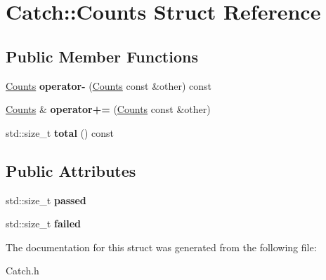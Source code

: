 \hypertarget{struct_catch_1_1_counts}{\section{Catch\-:\-:Counts Struct Reference}
\label{struct_catch_1_1_counts}
}
\subsection*{Public Member Functions}
\begin{DoxyCompactItemize}
\item 
\hypertarget{struct_catch_1_1_counts_aedf86fefe33938d132a6981171cd83e6}{\hyperlink{struct_catch_1_1_counts}{Counts} {\bfseries operator-\/} (\hyperlink{struct_catch_1_1_counts}{Counts} const \&other) const }\label{struct_catch_1_1_counts_aedf86fefe33938d132a6981171cd83e6}

\item 
\hypertarget{struct_catch_1_1_counts_a322a89475cd2cc039140ef371e973677}{\hyperlink{struct_catch_1_1_counts}{Counts} \& {\bfseries operator+=} (\hyperlink{struct_catch_1_1_counts}{Counts} const \&other)}\label{struct_catch_1_1_counts_a322a89475cd2cc039140ef371e973677}

\item 
\hypertarget{struct_catch_1_1_counts_a9125c662e30114e5c5cc94729b1e9e84}{std\-::size\-\_\-t {\bfseries total} () const }\label{struct_catch_1_1_counts_a9125c662e30114e5c5cc94729b1e9e84}

\end{DoxyCompactItemize}
\subsection*{Public Attributes}
\begin{DoxyCompactItemize}
\item 
\hypertarget{struct_catch_1_1_counts_ad28daaf3de28006400208b6dd0c631e6}{std\-::size\-\_\-t {\bfseries passed}}\label{struct_catch_1_1_counts_ad28daaf3de28006400208b6dd0c631e6}

\item 
\hypertarget{struct_catch_1_1_counts_a19982a3817a3bc2c07f0290e71f497a3}{std\-::size\-\_\-t {\bfseries failed}}\label{struct_catch_1_1_counts_a19982a3817a3bc2c07f0290e71f497a3}

\end{DoxyCompactItemize}


The documentation for this struct was generated from the following file\-:\begin{DoxyCompactItemize}
\item 
Catch.\-h\end{DoxyCompactItemize}
